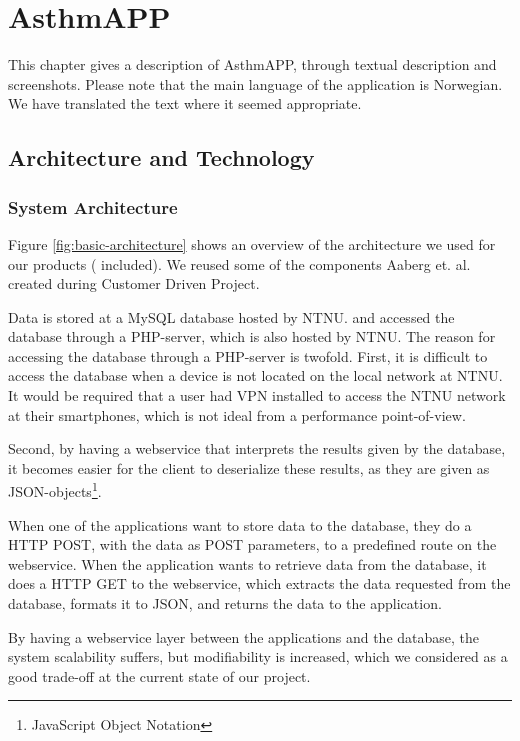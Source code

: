 \chapter{AsthmAPP}
\label{chp:description}

This chapter gives a description of AsthmAPP, through textual description and screenshots. Please note that the main language of the application is Norwegian. We have translated the text where it seemed appropriate. 

\section{Architecture and Technology}

\subsection{System Architecture}
\label{sec:architecture}
Figure \ref{fig:basic-architecture} shows an overview of the architecture we used for our products (\ab{} included). We reused some of the components Aaberg et. al. created during Customer Driven Project\cite{CustomerDriven}. 

Data is stored at a MySQL database hosted by NTNU. \app{} and \ab{} accessed the database through a PHP-server, which is also hosted by NTNU. The reason for accessing the database through a PHP-server is twofold. First, it is difficult to access the database when a device is not located on the local network at NTNU. It would be required that a user had VPN installed to access the NTNU network at their smartphones, which is not ideal from a performance point-of-view.

Second, by having a webservice that interprets the results given by the database, it becomes easier for the client to deserialize these results, as they are given as JSON-objects\footnote{JavaScript Object Notation}.    

When one of the applications want to store data to the database, they do a HTTP POST, with the data as POST parameters, to a predefined route on the webservice. When the application wants to retrieve data from the database, it does a HTTP GET to the webservice, which extracts the data requested from the database, formats it to JSON, and returns the data to the application.  

By having a webservice layer between the applications and the database, the system scalability suffers, but modifiability is increased, which we considered as a good trade-off at the current state of our project. 

